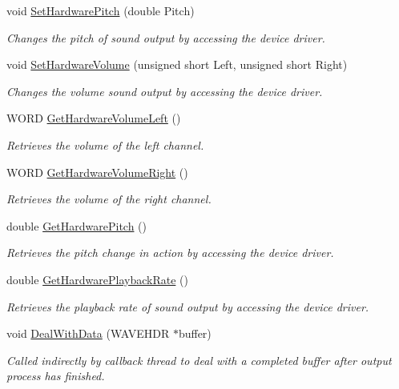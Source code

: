 \begin{DoxyCompactItemize}
void \hyperlink{class_sound_instance_output_a946a43ebff38b07df949cd8a54e8f603}{SetHardwarePitch} (double Pitch)
\begin{DoxyCompactList}\small\item\em Changes the pitch of sound output by accessing the device driver. \item\end{DoxyCompactList}\item 
void \hyperlink{class_sound_instance_output_a03ff3cd14c4fe05faa8836938afd6d41}{SetHardwareVolume} (unsigned short Left, unsigned short Right)
\begin{DoxyCompactList}\small\item\em Changes the volume sound output by accessing the device driver. \item\end{DoxyCompactList}\item 
WORD \hyperlink{class_sound_instance_output_a8592b296bc22bcf29d1761e21cada3ac}{GetHardwareVolumeLeft} ()
\begin{DoxyCompactList}\small\item\em Retrieves the volume of the left channel. \item\end{DoxyCompactList}\item 
WORD \hyperlink{class_sound_instance_output_a746a2958ede4a31f948c084065fbb584}{GetHardwareVolumeRight} ()
\begin{DoxyCompactList}\small\item\em Retrieves the volume of the right channel. \item\end{DoxyCompactList}\item 
double \hyperlink{class_sound_instance_output_a1194a6299e5483aa8d0d03f9e130db37}{GetHardwarePitch} ()
\begin{DoxyCompactList}\small\item\em Retrieves the pitch change in action by accessing the device driver. \item\end{DoxyCompactList}\item 
double \hyperlink{class_sound_instance_output_add8e3702351c8a3874ebe3ebb5cc4ba1}{GetHardwarePlaybackRate} ()
\begin{DoxyCompactList}\small\item\em Retrieves the playback rate of sound output by accessing the device driver. \item\end{DoxyCompactList}\item 
void \hyperlink{class_sound_instance_output_aab5f43bc2f2532543b8e0698c441d530}{DealWithData} (WAVEHDR $\ast$buffer)
\begin{DoxyCompactList}\small\item\em Called indirectly by callback thread to deal with a completed buffer after output process has finished. \item\end{DoxyCompactList}\end{DoxyCompactItemize}
